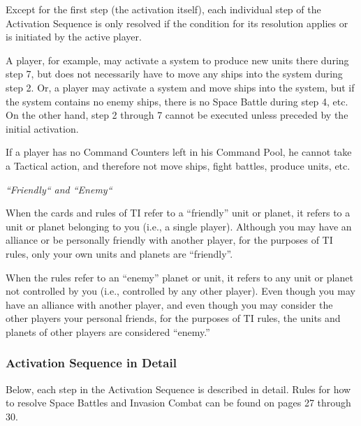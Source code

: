 \documentclass[11pt,fleqn]{book} %
\begin{document}
Except for the first step (the activation itself), each individual step of the Activation Sequence is only resolved if the condition for its resolution applies or is initiated by the active player. 

A player, for example, may activate a system to produce new units there during step 7, but does not necessarily have to move any ships into the system during step 2. Or, a player may activate a system and move ships into the system, but if the system contains no enemy ships, there is no Space Battle during step 4, etc.
On the other hand, step 2 through 7 cannot be executed unless preceded by the initial activation.

If a player has no Command Counters left in his Command Pool, he cannot take a Tactical action, and therefore not move ships, fight battles, produce units, etc.
\begin{FFGbox}
    \emph{“Friendly“ and “Enemy“}

When the cards and rules of TI refer to a “friendly” unit or planet, it refers to a unit or planet belonging to you (i.e., a single player). Although you may have an alliance or be personally friendly with another player, for the purposes of TI rules, only your own units and planets are “friendly”.

When the rules refer to an “enemy” planet or unit, it refers to any unit or planet not controlled by you (i.e., controlled by any other player). Even though you may have an alliance with another player, and even though you may consider the other players your personal friends, for the purposes of TI rules, the units and planets of other players are considered “enemy.”

\end{FFGbox}

\subsubsection{Activation Sequence in Detail}
Below, each step in the Activation Sequence is described in detail. Rules for how to resolve Space Battles and Invasion Combat can be found on pages 27 through 30.
\end{document}
